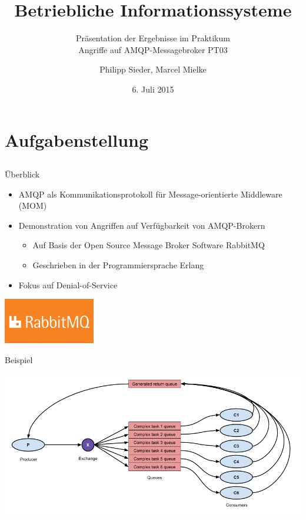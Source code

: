 \documentclass[10pt]{beamer}
\title{Betriebliche Informationssysteme}
\subtitle{Präsentation der Ergebnisse im Praktikum \\[0.8cm] \LARGE{Angriffe auf AMQP-Messagebroker} \tiny{PT03}}
\date{6. Juli 2015}
\author{Philipp Sieder, Marcel Mielke}
\institute{Hochschule für Technik, Wirtschaft und Kultur Leipzig / Universität Leipzig}
\begin{document}
\maketitle


\section{Aufgabenstellung}

\subsection{}
\begin{frame}{Überblick}

	\begin{itemize}
		\item AMQP als Kommunikationsprotokoll für Message-orientierte Middleware (MOM)
		\item Demonstration von Angriffen auf Verfügbarkeit von AMQP-Brokern
		\begin{itemize}
			\item Auf Basis der Open Source Message Broker Software \glqq RabbitMQ\grqq
			\item Geschrieben in der Programmiersprache Erlang
		\end{itemize}
		\item Fokus auf Denial-of-Service
	\end{itemize}
	
	\begin{center}
		\includegraphics[width=0.3\textwidth]{pic/rabbit_logo}
	\end{center}
		
\end{frame}


\begin{frame}{Beispiel}
	\begin{center}
		\includegraphics[width=\textwidth]{pic/over}
	\end{center}
\end{frame}
\end{document}
